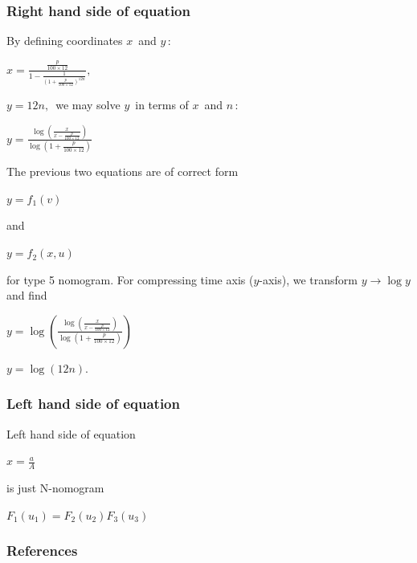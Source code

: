 \documentclass[a4paper,11pt,english]{sphinxmanual}
\begin{document}
\subsubsection{Right hand side of equation}
\label{examples/examples:right-hand-side-of-equation}
By defining coordinates \(x\,\) and \(y\,\):

\(x = \frac{\frac{p}{100\times 12}}{1-\frac{1}{(1+\frac{p}{100\times 12})^{12n}}},\)

\(y = 12n, \,\) we may solve \(y\,\) in terms of \(x\,\) and
\(n\,\):

\(y = \frac{\log (\frac{x}{x-\frac{p}{100\times 12}})}{\log (1+\frac{p}{100 \times 12})} \,\)

The previous two equations are of correct form

\(y = f_1(v) \,\)

and

\(y = f_2(x,u) \,\)

for type 5 nomogram. For compressing time axis (\(y\)-axis), we
transform \(y \rightarrow \log y\) and find

\(y = \log \left( \frac{\log (\frac{x}{x-\frac{p}{100\times 12}})}{\log (1+\frac{p}{100 \times 12})} \right)\,\)

\(y = \log( 12n ). \,\)


\subsubsection{Left hand side of equation}
\label{examples/examples:left-hand-side-of-equation}
Left hand side of equation

\(x = \frac{a}{A}\)

is just N-nomogram

\(F_1(u_1) = F_2(u_2)F_3(u_3) \,\)


\subsubsection{References}
\label{examples/examples:references}
\end{document}
